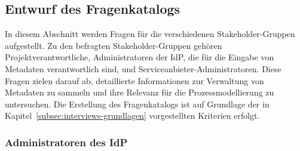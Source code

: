 \documentclass[a4paper, fontsize=11pt]{scrartcl}
\begin{document}
\subsection{Entwurf des Fragenkatalogs}\label{subsubsec:entwurf-fragenkatalog}

In diesem Abschnitt werden Fragen für die verschiedenen Stakeholder-Gruppen aufgestellt.
Zu den befragten Stakeholder-Gruppen gehören Projektverantwortliche, Administratoren der IdP, die für die Eingabe von Metadaten verantwortlich sind, und Serviceanbieter-Administratoren.
Diese Fragen zielen darauf ab, detaillierte Informationen zur Verwaltung von Metadaten zu sammeln und ihre Relevanz für die Prozessmodellierung zu untersuchen.
Die Erstellung des Fragenkatalogs ist auf Grundlage der in Kapitel~\ref{subsec:interviews-grundlagen} vorgestellten Kriterien erfolgt.

\subsubsection{Administratoren des IdP}
\end{document}
